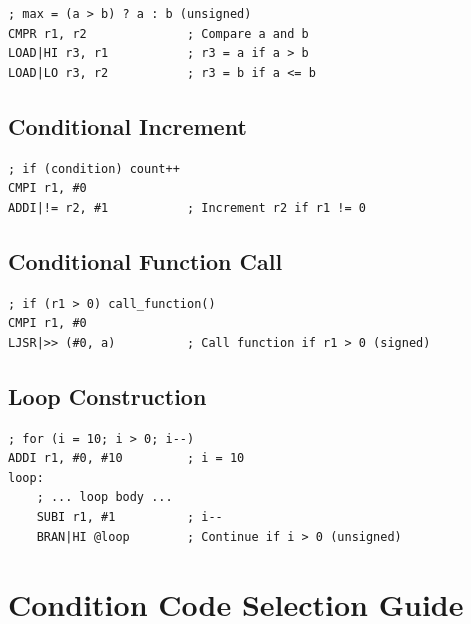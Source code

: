 \begin{lstlisting}
; max = (a > b) ? a : b (unsigned)
CMPR r1, r2              ; Compare a and b
LOAD|HI r3, r1           ; r3 = a if a > b
LOAD|LO r3, r2           ; r3 = b if a <= b
\end{lstlisting}

\subsection{Conditional Increment}

\begin{lstlisting}
; if (condition) count++
CMPI r1, #0
ADDI|!= r2, #1           ; Increment r2 if r1 != 0
\end{lstlisting}

\subsection{Conditional Function Call}

\begin{lstlisting}
; if (r1 > 0) call_function()
CMPI r1, #0
LJSR|>> (#0, a)          ; Call function if r1 > 0 (signed)
\end{lstlisting}

\subsection{Loop Construction}

\begin{lstlisting}
; for (i = 10; i > 0; i--)
ADDI r1, #0, #10         ; i = 10
loop:
    ; ... loop body ...
    SUBI r1, #1          ; i--
    BRAN|HI @loop        ; Continue if i > 0 (unsigned)
\end{lstlisting}

\section{Condition Code Selection Guide}

